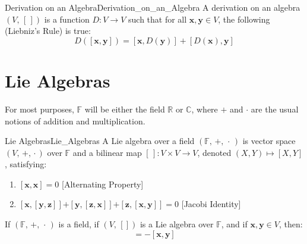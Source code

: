 \documentclass[crop=false,class=article]{standalone}                           %
\begin{document}
        \begin{fdefinition}{Derivation on an Algebra}{Derivation_on_an_Algebra}
            A derivation on an algebra $(V,\,[\,])$ is a function
            $D:V\rightarrow{V}$ such that for all $\mathbf{x},\mathbf{y}\in{V}$,
            the following (Liebniz's Rule) is true:
            \begin{equation}
                D([\mathbf{x},\mathbf{y}])
                =[\mathbf{x},D(\mathbf{y})]+[D(\mathbf{x}),\mathbf{y}]
            \end{equation}
        \end{fdefinition}
    \section{Lie Algebras}
        For most purposes, $\mathbb{F}$ will be either the field $\mathbb{R}$
        or $\mathbb{C}$, where $+$ and $\cdot$ are the usual notions of
        addition and multiplication.
        \begin{fdefinition}{Lie Algebras}{Lie_Algebras}
            A Lie algebra over a field $(\mathbb{F},\,+,\,\cdot\,)$
            is vector space $(V,\,\boldsymbol{+},\,\boldsymbol{\cdot}\,)$
            over $\mathbb{F}$ and a bilinear map
            $[\,]:V\times{V}\rightarrow{V}$, denoted $(X,Y)\mapsto[X,Y]$,
            satisfying:
            \begin{enumerate}
                \item $[\mathbf{x},\mathbf{x}]=0$
                      \hfill[Alternating Property]
                \item $[\mathbf{x},[\mathbf{y},\mathbf{z}]]%
                       \boldsymbol{+}[\mathbf{y},[\mathbf{z},\mathbf{x}]]%
                       \boldsymbol{+}[\mathbf{z},[\mathbf{x},\mathbf{y}]]=0$
                      \hfill[Jacobi Identity]
            \end{enumerate}
        \end{fdefinition}
        \begin{theorem}
            \label{thm:Lie_Bracket_Anti_Commutes}%
            If $(\mathbb{F},\,+,\,\cdot\,)$ is a field, if $(V,\,[])$ is a
            Lie algebra over $\mathbb{F}$, and if
            $\mathbf{x},\mathbf{y}\in{V}$, then:
            \begin{equation}
                [\mathbf{x},\mathbf{y}]=\minus[\mathbf{x},\mathbf{y}]
            \end{equation}
        \end{theorem}
\end{document}
